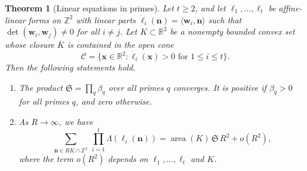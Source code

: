 \documentclass[12pt,oneside,openany]{book}
\theoremstyle{definition}
\theoremstyle{plain}
\numberwithin{equation}{chapter}
\theoremstyle{plain}
\newtheorem{theorem}{Theorem}[chapter]
\theoremstyle{definition}
\theoremstyle{remark}
\newcommand{\Z}{\mathbb Z}
\newcommand{\R}{\mathbb R}
\DeclareMathOperator{\area}{area}
\begin{document}
\begin{theorem}[Linear equations in primes]\label{thm:gtz}
Let $t\ge2$, and let $\ell_1,\dots,\ell_t$ be affine-linear forms on $\Z^2$ with linear parts $\dot\ell_i(\mathbf n)=\langle\mathbf w_i,\mathbf n\rangle$ such that $\det(\mathbf w_i,\mathbf w_j)\ne0$ for all $i\ne j$. Let $K\subset\R^2$ be a nonempty bounded convex set whose closure $\overline K$ is contained in the open cone
\[
\mathcal C=\{\mathbf x\in\R^2:\dot\ell_i(\mathbf x)>0\text{ for }1\le i\le t\}.
\]
Then the following statements hold.
\begin{enumerate}[label=(\arabic*)]
\item\label{item:gtz-product} The product $\mathfrak S=\prod_q\beta_q$ over all primes $q$ converges. It is positive if $\beta_q>0$ for all primes $q$, and zero otherwise.
\item\label{item:gtz-asymptotic} As $R\to\infty$, we have
\begin{equation}\label{eq:gtz}
\sum_{\mathbf n\in RK\cap\Z^2}\ \prod_{i=1}^t\Lambda(\ell_i(\mathbf n))=\area(K)\,\mathfrak S\,R^2+o(R^2),
\end{equation}
where the term $o(R^2)$ depends on $\ell_1,\dots,\ell_t$ and $K$.
\end{enumerate}
\end{theorem}
\end{document}
